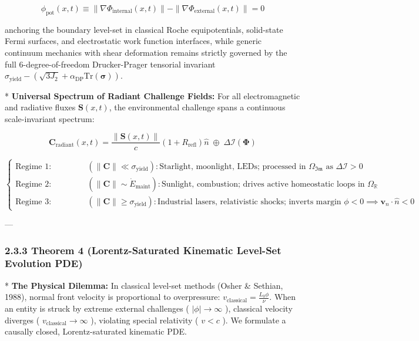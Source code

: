 \documentclass[11pt,a4paper]{article}
\theoremstyle{definition}
\theoremstyle{remark}
\begin{document}
\begin{equation}
\boxed{\phi_{\text{pot}}(x, t) \equiv \|\nabla \Phi_{\text{internal}}(x, t)\| - \|\nabla \Phi_{\text{external}}(x, t)\| = 0}
\end{equation}


anchoring the boundary level-set in classical Roche equipotentials, solid-state Fermi surfaces, and electrostatic work function interfaces, while generic continuum mechanics with shear deformation remains strictly governed by the full 6-degree-of-freedom Drucker-Prager tensorial invariant $\sigma_{\text{yield}} - (\sqrt{3 J_2} + \alpha_{\text{DP}}\mathrm{Tr}(\boldsymbol{\sigma}))$.

* \textbf{Universal Spectrum of Radiant Challenge Fields:}
For all electromagnetic and radiative fluxes $\mathbf{S}(x, t)$, the environmental challenge spans a continuous scale-invariant spectrum:


\begin{equation}
\mathbf{C}_{\text{radiant}}(x, t) = \frac{\|\mathbf{S}(x, t)\|}{c}(1 + R_{\text{refl}})\hat{n} \;\oplus\; \Delta \mathcal{I}(\mathbf{\Phi})
\end{equation}



\begin{equation}
\begin{cases}
\text{Regime 1: Informational Signal} & (\|\mathbf{C}\| \ll \sigma_{\text{yield}}): \text{Starlight, moonlight, LEDs; processed in } \Omega_{\mathfrak{Im}} \text{ as } \Delta \mathcal{I} > 0 \\
\text{Regime 2: Metabolic / Thermal} & (\|\mathbf{C}\| \sim \dot{E}_{\text{maint}}): \text{Sunlight, combustion; drives active homeostatic loops in } \Omega_{\mathbb{R}} \\
\text{Regime 3: Ablative / Fracture} & (\|\mathbf{C}\| \ge \sigma_{\text{yield}}): \text{Industrial lasers, relativistic shocks; inverts margin } \phi < 0 \implies \mathbf{v}_n \cdot \hat{n} < 0
\end{cases}
\end{equation}


---

\subsubsection{2.3.3 Theorem 4 (Lorentz-Saturated Kinematic Level-Set Evolution PDE)}
* \textbf{The Physical Dilemma:} In classical level-set methods (Osher \& Sethian, 1988), normal front velocity is proportional to overpressure: $v_{\text{classical}} = \frac{L_0 \phi}{\nu}$. When an entity is struck by extreme external challenges ( $|\phi| \to \infty$ ), classical velocity diverges ( $v_{\text{classical}} \to \infty$ ), violating special relativity ( $v < c$ ). We formulate a causally closed, Lorentz-saturated kinematic PDE.
\end{document}
